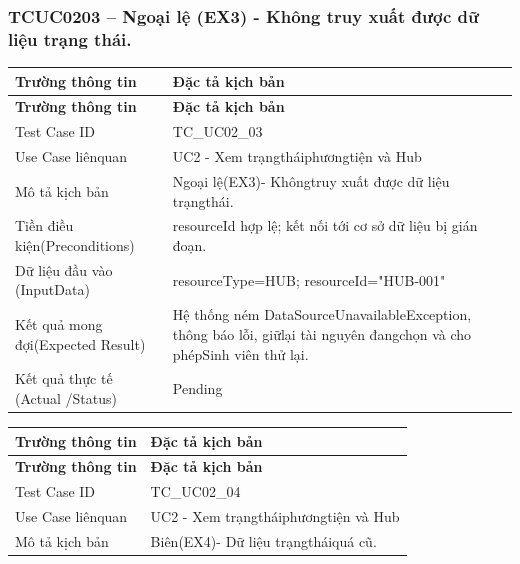 \subsubsection{TCUC0203 – Ngoại lệ (EX3) - Không truy xuất được dữ liệu trạng thái.}
\begin{longtable}{|L{0.24\textwidth}|L{0.70\textwidth}|}
\hline
\textbf{Trường thông tin} & \textbf{Đặc tả kịch bản} \\
\hline
\endfirsthead
\hline
\textbf{Trường thông tin} & \textbf{Đặc tả kịch bản} \\
\hline
\endhead
Test Case ID & TC\_UC02\_03 \\
\hline
Use Case liênquan & UC2 - Xem trạngtháiphươngtiện và Hub \\
\hline
Mô tả kịch bản & Ngoại lệ(EX3)- Khôngtruy xuất được dữ liệu trạngthái. \\
\hline
Tiền điều kiện\newline (Preconditions) & resourceId hợp lệ; kết nối tới cơ sở dữ liệu bị gián đoạn. \\
\hline
Dữ liệu đầu vào (Input\newline Data) & resourceType=HUB; resourceId="HUB-001" \\
\hline
Kết quả mong đợi\newline (Expected Result) & Hệ thống ném DataSourceUnavailableException, thông báo lỗi, giữ\newline lại tài nguyên đangchọn và cho phépSinh viên thử lại. \\
\hline
Kết quả thực tế (Actual /\newline Status) & Pending \\
\hline
\end{longtable}
\vspace{-0.5\baselineskip}
\begin{longtable}{|L{0.24\textwidth}|L{0.70\textwidth}|}
\hline
\textbf{Trường thông tin} & \textbf{Đặc tả kịch bản} \\
\hline
\endfirsthead
\hline
\textbf{Trường thông tin} & \textbf{Đặc tả kịch bản} \\
\hline
\endhead
Test Case ID & TC\_UC02\_04 \\
\hline
Use Case liênquan & UC2 - Xem trạngtháiphươngtiện và Hub \\
\hline
Mô tả kịch bản & Biên(EX4)- Dữ liệu trạngtháiquá cũ. \\
\hline
\end{longtable}
\vspace{-0.5\baselineskip}
